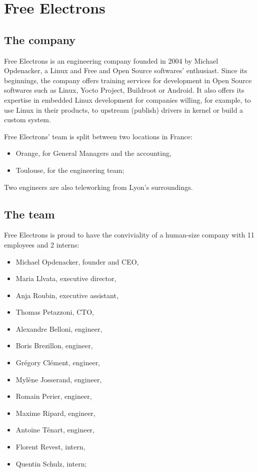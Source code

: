 \chapter{Free Electrons}

\section{The company}
Free Electrons is an engineering company founded in 2004 by Michael Opdenacker, a Linux and Free and Open Source softwares' enthusiast. Since its beginnings, the company offers training services for development in Open Source softwares such as Linux, Yocto Project, Buildroot or Android. It also offers its expertise in embedded Linux development for companies willing, for example, to use Linux in their products, to upstream (publish) drivers in kernel or build a custom system.


Free Electrons' team is split between two locations in France:
\begin{itemize}
  \item Orange, for General Managers and the accounting,
  \item Toulouse, for the engineering team;
\end{itemize}

Two engineers are also teleworking from Lyon's surroundings.

\section{The team}


Free Electrons is proud to have the conviviality of a human-size company with 11 employees and 2 interns:
\begin{itemize}
  \item Michael Opdenacker, founder and CEO,
  \item Maria Llvata, executive director,
  \item Anja Roubin, executive assistant,
  \item Thomas Petazzoni, CTO,
  \item Alexandre Belloni, engineer,
  \item Boris Brezillon, engineer,
  \item Grégory Clément, engineer,
  \item Mylène Josserand, engineer,
  \item Romain Perier, engineer,
  \item Maxime Ripard, engineer,
  \item Antoine Ténart, engineer,
  \item Florent Revest, intern,
  \item Quentin Schulz, intern;
\end{itemize}

